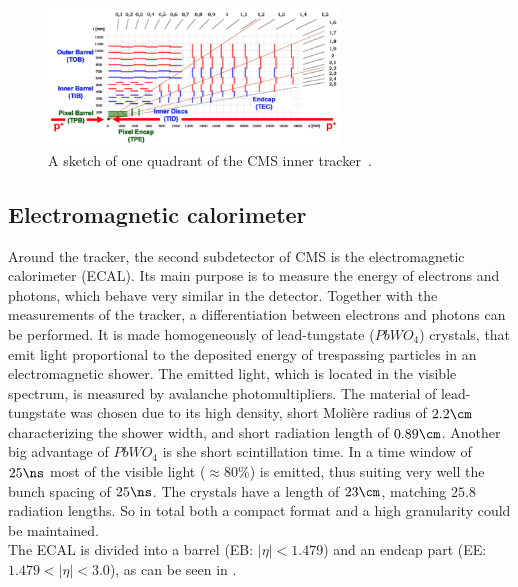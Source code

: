 \begin{figure}[hbtp]
 \centering
 \includegraphics[width=0.69\textwidth]{figures/general/tracker.png}
 \caption{A sketch of one quadrant of the CMS inner tracker~\cite{TrackerPicture}.}
 \label{fig:tracker}
\end{figure}

\subsection{Electromagnetic calorimeter}
Around the tracker, the second subdetector of CMS is the electromagnetic calorimeter (ECAL). Its main purpose is to measure the energy of electrons and photons, which behave very similar in the detector. Together with the measurements of the tracker, a differentiation between electrons and photons can be performed. It is made homogeneously of lead-tungstate ($PbWO_4$) crystals, that emit light proportional to the deposited energy of trespassing particles in an electromagnetic shower. The emitted light, which is located in the visible spectrum, is measured by avalanche photomultipliers. The material of lead-tungstate was chosen due to its high density, short Moli\`{e}re radius of $2.2\cm$ characterizing the shower width, and short radiation length of $0.89\cm$. Another big advantage of $PbWO_4$ is she short scintillation time. In a time window of $25\ns$ most of the visible light ($\approx80\%$) is emitted, thus suiting very well the bunch spacing of $25\ns$. The crystals have a length of $23\cm$, matching $25.8$ radiation lengths. So in total both a compact format and a high granularity could be maintained.\\
The ECAL is divided into a barrel (EB: $|\eta|<1.479$) and an endcap part (EE: $1.479<|\eta|<3.0$), as can be seen in .
